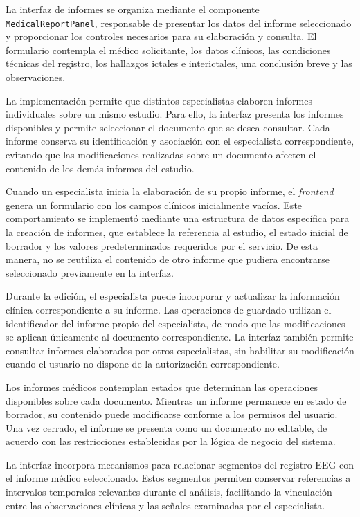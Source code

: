 La interfaz de informes se organiza mediante
el componente \texttt{MedicalReportPanel},
responsable de presentar los datos del informe
seleccionado y proporcionar los controles
necesarios para su elaboración y consulta.
El formulario contempla el médico solicitante, los datos clínicos, las condiciones técnicas del registro, los hallazgos ictales e interictales, una conclusión breve y las observaciones.

La implementación permite que distintos
especialistas elaboren informes individuales
sobre un mismo estudio. Para ello, la interfaz
presenta los informes disponibles y permite
seleccionar el documento que se desea consultar.
Cada informe conserva su identificación y
asociación con el especialista correspondiente,
evitando que las modificaciones realizadas
sobre un documento afecten el contenido
de los demás informes del estudio.

Cuando un especialista inicia la elaboración
de su propio informe, el \textit{frontend} genera
un formulario con los campos clínicos
inicialmente vacíos. Este comportamiento
se implementó mediante una estructura de
datos específica para la creación de informes,
que establece la referencia al estudio,
el estado inicial de borrador y los valores
predeterminados requeridos por el servicio.
De esta manera, no se reutiliza el contenido
de otro informe que pudiera encontrarse
seleccionado previamente en la interfaz.

Durante la edición, el especialista puede
incorporar y actualizar la información
clínica correspondiente a su informe.
Las operaciones de guardado utilizan el identificador del informe propio del especialista, de modo que las modificaciones se aplican únicamente al documento correspondiente.
La interfaz también permite consultar
informes elaborados por otros especialistas,
sin habilitar su modificación cuando
el usuario no dispone de la autorización
correspondiente.

Los informes médicos contemplan estados
que determinan las operaciones disponibles
sobre cada documento. Mientras un informe
permanece en estado de borrador, su
contenido puede modificarse conforme
a los permisos del usuario. Una vez
cerrado, el informe se presenta como
un documento no editable, de acuerdo
con las restricciones establecidas
por la lógica de negocio del sistema.

La interfaz incorpora mecanismos para
relacionar segmentos del registro EEG
con el informe médico seleccionado.
Estos segmentos permiten conservar
referencias a intervalos temporales
relevantes durante el análisis,
facilitando la vinculación entre
las observaciones clínicas y las
señales examinadas por el especialista.

